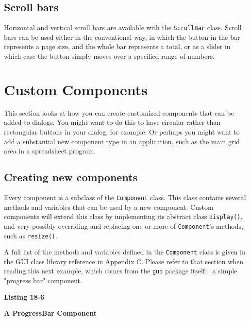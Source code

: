 \subsection*{Scroll bars}

Horizontal and vertical scroll bars are available with the
\texttt{ScrollBar} class. Scroll bars can be used either in the
conventional way, in which the button in the bar represents a page
size, and the whole bar represents a total, or as a slider in which
case the button simply moves over a specified range of numbers.

\section{Custom Components}

This section looks at how you can create customized components that can
be added to dialogs. You might want to do this to have circular rather
than rectangular buttons in your dialog, for example. Or perhaps you
might want to add a substantial new component type in an application,
such as the main grid area in a spreadsheet program.

\subsection*{Creating new components}

Every component is a subclass of the \texttt{Component}
class. This class contains several methods and variables that can be
used by a new component. Custom components will extend this class by
implementing its abstract class \texttt{display()}, and very possibly
overriding and replacing one or more of
\texttt{Component}'s methods, such as
\texttt{resize()}.

A full list of the methods and variables defined in the
\texttt{Component} class is given in the GUI class library reference in
Appendix C. Please refer to that section when reading this next
example, which comes from the \texttt{gui} package itself: \ a simple
"progress bar" component.

{\sffamily\bfseries
Listing 18-6}

{\sffamily\bfseries
A ProgressBar Component}

